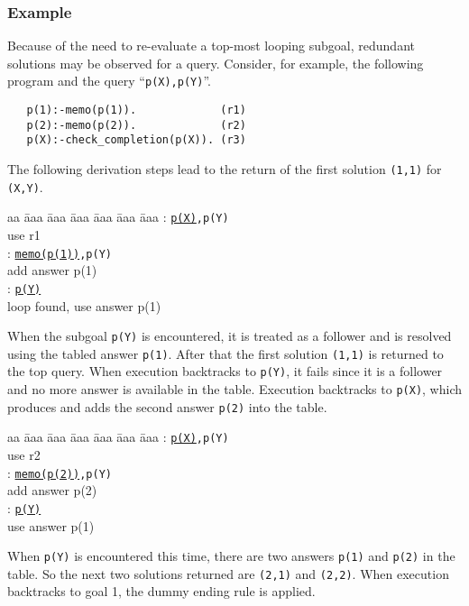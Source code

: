 \documentclass{tlp}
\begin{document}
\subsubsection{Example}
Because of the need to re-evaluate a top-most looping subgoal, redundant solutions may be observed for a query. Consider, for example, the following program and the query ``{\tt p(X),p(Y)}''.
\begin{verbatim}
   p(1):-memo(p(1)).             (r1)
   p(2):-memo(p(2)).             (r2)       
   p(X):-check_completion(p(X)). (r3)
\end{verbatim}
The following derivation steps lead to the return of the first solution {\tt (1,1)} for {\tt (X,Y)}.
\begin{tabbing}
aa \= aaa \= aaa \= aaa \= aaa \= aaa \= aaa \kill
\> : {\tt \underline{p(X)},p(Y)} \\
\> \> \>  {\scriptsize use r1} \\
\> : {\tt \underline{memo(p(1))},p(Y)} \\ 
\> \> \>  {\scriptsize add answer p(1)} \\
\> : {\tt \underline{p(Y)}} \\ 
\> \> \>  {\scriptsize loop found, use answer p(1)} \\
\end{tabbing}      
When the subgoal {\tt p(Y)} is encountered, it is treated as a follower and is resolved using the tabled answer {\tt p(1)}. After that the first solution {\tt (1,1)} is returned to the top query. When execution backtracks to {\tt p(Y)}, it fails since it is a follower and no more answer is available in the table. Execution backtracks to {\tt p(X)}, which produces and adds the second answer {\tt p(2)} into the table.
\begin{tabbing}
aa \= aaa \= aaa \= aaa \= aaa \= aaa \= aaa \kill
\> : {\tt \underline{p(X)},p(Y)} \\
\> \> \>  {\scriptsize use r2} \\
\> : {\tt \underline{memo(p(2))},p(Y)} \\ 
\> \> \>  {\scriptsize add answer p(2)} \\
\> : {\tt \underline{p(Y)}} \\ 
\> \> \>  {\scriptsize use answer p(1)} \\
\end{tabbing}      
When {\tt p(Y)} is encountered this time, there are two answers {\tt p(1)} and {\tt p(2)} in the table. So the next two solutions returned are {\tt (2,1)} and {\tt (2,2)}. When execution backtracks to goal 1, the dummy ending rule is applied.
\end{document}
